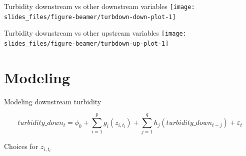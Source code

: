 \documentclass[14pt,ignorenonframetext,compress]{beamer}
\begin{document}
\begin{frame}
\begin{block}{Turbidity downstream vs other downstream variables}
\protect\hypertarget{turbidity-downstream-vs-other-downstream-variables}{}
\texttt{[image: slides\_files/figure-beamer/turbdown-down-plot-1]}
\end{block}
\end{frame}

\begin{frame}
\begin{block}{Turbidity downstream vs other upstream variables}
\protect\hypertarget{turbidity-downstream-vs-other-upstream-variables}{}
\texttt{[image: slides\_files/figure-beamer/turbdown-up-plot-1]}
\end{block}
\end{frame}

\hypertarget{modeling}{%
\section{Modeling}\label{modeling}}

\begin{frame}{Modeling downstream turbidity}
\protect\hypertarget{modeling-downstream-turbidity}{}
\small

\begin{equation*}\label{eq:gam_main}
turbidity\_down_t = \phi_0 + \sum_{i=1}^pg_i(z_{i,t_l}) + \sum_{j=1}^qh_j(turbidity\_down_{t-j}) + \varepsilon_t
\end{equation*}

\begin{block}{Choices for \(z_{i,t_l}\)}
\protect\hypertarget{choices-for-z_it_l}{}
\begin{table}
\centering\begingroup\fontsize{10}{12}\selectfont

\endgroup{}
\end{table}
\end{block}
\end{frame}
\end{document}
